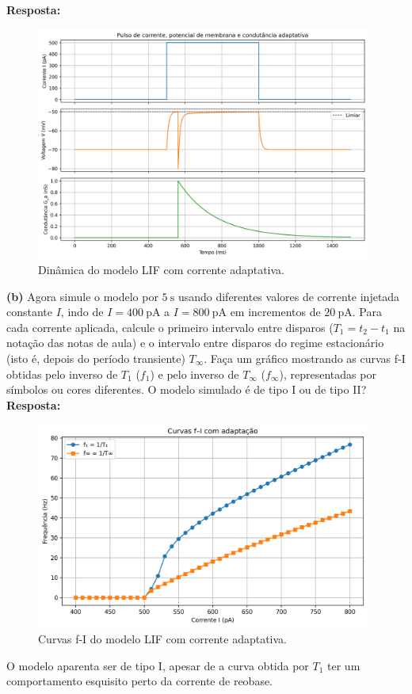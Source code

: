 \documentclass[english,11pt,a4paper]{article}
\begin{document}
	\noindent\textbf{Resposta:}
	
	\begin{figure}[H]
		\centering
		\includegraphics[width=11cm]{../figures/ex_3a.png}
		\caption{Dinâmica do modelo LIF com corrente adaptativa.}
	\end{figure}
	
	
	\noindent \textbf{(b)} Agora simule o modelo por $5 \ \text{s}$ usando diferentes valores de corrente injetada constante $I$, indo de $I = 400 \ \text{pA}$ a $I = 800 \ \text{pA}$ em incrementos de $20 \ \text{pA}$. Para cada corrente aplicada, calcule o primeiro intervalo entre disparos ($T_1 = t_2 - t_1$ na notação das notas de aula) e o intervalo entre disparos do regime estacionário (isto é, depois do período transiente) $T_\infty$. Faça um gráfico mostrando as curvas f-I obtidas pelo inverso de $T_1$ ($f_1$) e pelo inverso de $T_\infty$ ($f_\infty$), representadas por símbolos ou cores diferentes. O modelo simulado é de tipo I ou de tipo II?\\
	
	\noindent\textbf{Resposta:}
	
	\begin{figure}[H]
		\centering
		\includegraphics[width=11cm]{../figures/ex_3b.png}
		\caption{Curvas f-I do modelo LIF com corrente adaptativa.}
	\end{figure}
	
	O modelo aparenta ser de tipo I, apesar de a curva obtida por $T_1$ ter um comportamento esquisito perto da corrente de reobase.
	
\end{document}
